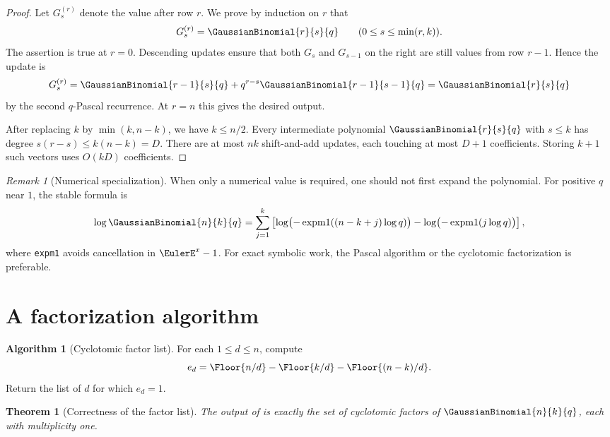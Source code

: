 \documentclass[11pt,a4paper,oneside,openany]{book}
\newtheorem{theorem}{Theorem}[chapter]
\theoremstyle{definition}
\newtheorem{algorithm}[algorithm]{Algorithm}
\theoremstyle{remark}
\newtheorem{remark}[remark]{Remark}
\begin{document}
\begin{proof}
Let $G_s^{(r)}$ denote the value after row $r$.  We prove by induction on $r$ that
\[
 G_s^{(r)}=\GaussianBinomial{r}{s}{q}
 \qquad(0\le s\le\min(r,k)).
\]
The assertion is true at $r=0$.  Descending updates ensure that both $G_s$ and $G_{s-1}$ on the right are still values from row $r-1$.  Hence the update is
\[
 G_s^{(r)}
 =\GaussianBinomial{r-1}{s}{q}+q^{r-s}\GaussianBinomial{r-1}{s-1}{q}
 =\GaussianBinomial{r}{s}{q}
\]
by the second $q$-Pascal recurrence.  At $r=n$ this gives the desired output.

After replacing $k$ by $\min(k,n-k)$, we have $k\le n/2$.  Every intermediate polynomial $\GaussianBinomial{r}{s}{q}$ with $s\le k$ has degree $s(r-s)\le k(n-k)=D$.  There are at most $nk$ shift-and-add updates, each touching at most $D+1$ coefficients.  Storing $k+1$ such vectors uses $O(kD)$ coefficients.
\end{proof}

\begin{remark}[Numerical specialization]
When only a numerical value is required, one should not first expand the polynomial.  For positive $q$ near $1$, the stable formula is
\[
 \log\GaussianBinomial{n}{k}{q}
 =\sum_{j=1}^{k}
 \left[\log\bigl(-\operatorname{expm1}((n-k+j)\log q)\bigr)
      -\log\bigl(-\operatorname{expm1}(j\log q)\bigr)\right],
\]
where \texttt{expm1} avoids cancellation in $\EulerE^x-1$.  For exact symbolic work, the Pascal algorithm or the cyclotomic factorization is preferable.
\end{remark}

\section{A factorization algorithm}

\begin{algorithm}[Cyclotomic factor list]\label{alg:cyclotomic-list}
For each $1\le d\le n$, compute
\[
 e_d=\Floor{n/d}-\Floor{k/d}-\Floor{(n-k)/d}.
\]
Return the list of $d$ for which $e_d=1$.
\end{algorithm}

\begin{theorem}[Correctness of the factor list]\label{thm:cyclotomic-list-correct}
The output of  is exactly the set of cyclotomic factors of $\GaussianBinomial{n}{k}{q}$, each with multiplicity one.
\end{theorem}
\end{document}
